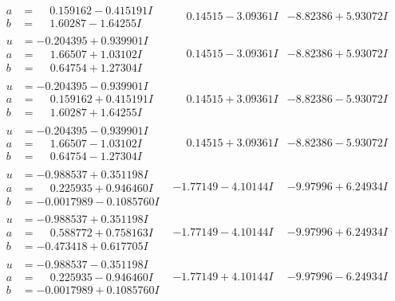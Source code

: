 \documentclass[1p]{elsarticle_modified}
\theoremstyle{definition}
\begin{document}
$$\begin{array}{c|c|c}
\begin{aligned}
a &= \phantom{-}0.159162 - 0.415191 I \\
b &= \phantom{-}1.60287 - 1.64255 I\end{aligned}
 & \phantom{-}0.14515 - 3.09361 I & -8.82386 + 5.93072 I \\ \hline\begin{aligned}
u &= -0.204395 + 0.939901 I \\
a &= \phantom{-}1.66507 + 1.03102 I \\
b &= \phantom{-}0.64754 + 1.27304 I\end{aligned}
 & \phantom{-}0.14515 - 3.09361 I & -8.82386 + 5.93072 I \\ \hline\begin{aligned}
u &= -0.204395 - 0.939901 I \\
a &= \phantom{-}0.159162 + 0.415191 I \\
b &= \phantom{-}1.60287 + 1.64255 I\end{aligned}
 & \phantom{-}0.14515 + 3.09361 I & -8.82386 - 5.93072 I \\ \hline\begin{aligned}
u &= -0.204395 - 0.939901 I \\
a &= \phantom{-}1.66507 - 1.03102 I \\
b &= \phantom{-}0.64754 - 1.27304 I\end{aligned}
 & \phantom{-}0.14515 + 3.09361 I & -8.82386 - 5.93072 I \\ \hline\begin{aligned}
u &= -0.988537 + 0.351198 I \\
a &= \phantom{-}0.225935 + 0.946460 I \\
b &= -0.0017989 - 0.1085760 I\end{aligned}
 & -1.77149 - 4.10144 I & -9.97996 + 6.24934 I \\ \hline\begin{aligned}
u &= -0.988537 + 0.351198 I \\
a &= \phantom{-}0.588772 + 0.758163 I \\
b &= -0.473418 + 0.617705 I\end{aligned}
 & -1.77149 - 4.10144 I & -9.97996 + 6.24934 I \\ \hline\begin{aligned}
u &= -0.988537 - 0.351198 I \\
a &= \phantom{-}0.225935 - 0.946460 I \\
b &= -0.0017989 + 0.1085760 I\end{aligned}
 & -1.77149 + 4.10144 I & -9.97996 - 6.24934 I \\ \hline\begin{aligned}

\end{aligned}
\end{array}$$
\end{document}
